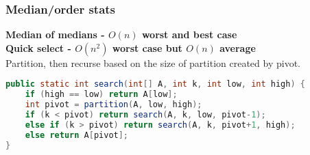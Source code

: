 \subsubsection{Median/order stats}
\textbf{Median of medians - $O(n)$ worst and best case}\\
\textbf{Quick select - $O(n^2)$ worst case but $O(n)$ average}\\
Partition, then recurse based on the size of partition created by pivot.
\begin{lstlisting}[language=java]
public static int search(int[] A, int k, int low, int high) {
    if (high == low) return A[low];
    int pivot = partition(A, low, high);
    if (k < pivot) return search(A, k, low, pivot-1);
    else if (k > pivot) return search(A, k, pivot+1, high);
    else return A[pivot];
}
\end{lstlisting}







